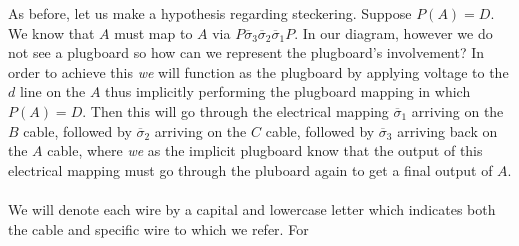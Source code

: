 \begin{center}
\end{center}
As before, let us make a hypothesis regarding steckering. Suppose
$P(A) = D$. We know that $A$ must map to $A$ via
$P\overline\sigma_3\overline\sigma_2\overline\sigma_1 P$. In our
diagram, however we do not see a plugboard so how can we represent
the plugboard's involvement? In order
to achieve this \emph{we} will function as the plugboard by applying
voltage to the $d$ line on the $A$ thus implicitly performing the
plugboard mapping in which $P(A) = D$.
Then this will go through the electrical mapping $\overline\sigma_1$
arriving on the $B$ cable, followed by $\overline\sigma_2$ arriving
on the $C$ cable, followed by $\overline\sigma_3$ arriving back on
the $A$ cable, where \emph{we} as the implicit plugboard know that
the output of this electrical mapping must go through the pluboard
again to get a final output of $A$.
\\\\We will denote each wire by a capital and lowercase letter which
indicates both the cable and specific wire to which we refer. For
